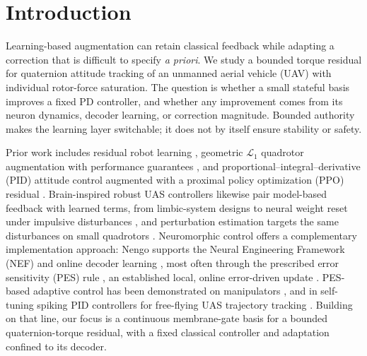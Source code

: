 \documentclass[letterpaper, 10 pt, conference]{ieeeconf}
\begin{document}
\section{Introduction}

Learning-based augmentation can retain classical feedback while adapting a correction that is difficult to specify \emph{a priori}. We study a bounded torque residual for quaternion attitude tracking of an unmanned aerial vehicle (UAV) with individual rotor-force saturation. The question is whether a small stateful basis improves a fixed PD controller, and whether any improvement comes from its neuron dynamics, decoder learning, or correction magnitude. Bounded authority makes the learning layer switchable; it does not by itself ensure stability or safety.

Prior work includes residual robot learning \cite{johannink2019}, geometric $\mathcal L_1$ quadrotor augmentation with performance guarantees \cite{wu2025l1quad}, and proportional--integral--derivative (PID) attitude control augmented with a proximal policy optimization (PPO) residual \cite{li2027hpappo}.
%
Brain-inspired robust UAS controllers likewise pair model-based feedback with learned terms, from limbic-system designs \cite{rubioscola2023limbic,escareno2024limbic} to neural weight reset under impulsive disturbances \cite{rubioscola2023weightreset}, and perturbation estimation targets the same disturbances on small quadrotors \cite{rubioscola2021mambo}.
Neuromorphic control offers a complementary implementation approach: Nengo supports the Neural Engineering Framework (NEF) \cite{eliasmith2004neuraleng} and online decoder learning \cite{bekolay2014nengo}, most often through the prescribed error sensitivity (PES) rule \cite{macneil2011pes}, an established local, online error-driven update \cite{voelker2015pes}. PES-based adaptive control has been demonstrated on manipulators \cite{dewolf2016arm,dewolf2020nengo}, and in self-tuning spiking PID controllers for free-flying UAS trajectory tracking \cite{olivares2025ifac,olivares2026selftuning}.
Building on that line, our focus is a continuous membrane-gate basis for a bounded quaternion-torque residual, with a fixed classical controller and adaptation confined to its decoder.
\end{document}
